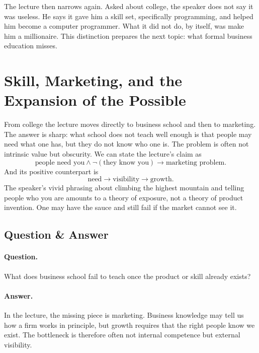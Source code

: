 The lecture then narrows again. Asked about college, the speaker does not say it was useless. He says it gave him a skill set, specifically programming, and helped him become a computer programmer. What it did not do, by itself, was make him a millionaire. This distinction prepares the next topic: what formal business education misses.

\section{Skill, Marketing, and the Expansion of the Possible}

From college the lecture moves directly to business school and then to marketing. The answer is sharp: what school does not teach well enough is that people may need what one has, but they do not know who one is. The problem is often not intrinsic value but obscurity. We can state the lecture's claim as
\begin{equation}
\text{people need you} \land \neg(\text{they know you}) \to \text{marketing problem}.
\end{equation}
And its positive counterpart is
\begin{equation}
\text{need} \to \text{visibility} \to \text{growth}.
\end{equation}
The speaker's vivid phrasing about climbing the highest mountain and telling people who you are amounts to a theory of exposure, not a theory of product invention. One may have the sauce and still fail if the market cannot see it.

\subsection{Question \& Answer}

\paragraph{Question.} What does business school fail to teach once the product or skill already exists?

\paragraph{Answer.} In the lecture, the missing piece is marketing. Business knowledge may tell us how a firm works in principle, but growth requires that the right people know we exist. The bottleneck is therefore often not internal competence but external visibility.

